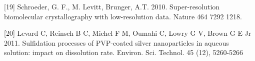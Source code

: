 \documentclass [11pt,fleqn]{article}
\begin{document}
%
%
[19] Schroeder, G. F., M. Levitt, Brunger, A.T. 2010. Super-resolution
biomolecular crystallography with low-resolution data. Nature 464 7292 1218.


[20]  Levard C, Reinsch  B C, Michel F M, Oumahi  C, Lowry G V, Brown G E  Jr  2011. Sulfidation processes of PVP-coated silver nanoparticles in aqueous solution: impact on dissolution rate. Environ. Sci. Technol.  45 (12), 5260-5266
\end{document}
